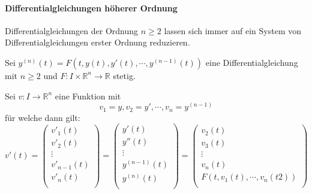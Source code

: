 		\paragraph{Differentialgleichungen höherer Ordnung}
			Differentialgleichungen der Ordnung $ n \geq 2 $ lassen sich immer auf ein System von Differentialgleichungen erster Ordnung reduzieren.

			Sei $ y ^ {(n)} (t) = F(t, y(t), y'(t), \cdots, y ^ {(n - 1)} (t)) $ eine Differentialgleichung mit $ n \geq 2 $ und $ F : I \times \mathbb{R} ^ n \rightarrow \mathbb{R} $ stetig.

			Sei $ v : I \rightarrow \mathbb{R} ^ n $ eine Funktion mit \[ v _ 1 = y, v _ 2 = y', \cdots, v _ n = y ^ {( n - 1 )} \] für welche dann gilt:
			\begin{equation*}
				v'(t) =
				\begin{pmatrix}
					v' _ 1 (t)         \\
					v' _ 2 (t)         \\
					\vdots             \\
					v' _ { n - 1 } (t) \\
					v' _ n (t)         \\
				\end{pmatrix}
				=
				\begin{pmatrix}
					y'(t)             \\
					y''(t)            \\
					\vdots            \\
					y ^ {(n - 1)} (t) \\
					y ^ {(n)} (t)     \\
				\end{pmatrix}
				=
				\begin{pmatrix}
					v _ 2 (t)                           \\
					v _ 3 (t)                           \\
					\vdots                              \\
					v _ n (t)                           \\
					F(t, v _ 1 (t), \cdots, v _ n (t2)) \\
				\end{pmatrix}
			\end{equation*}


